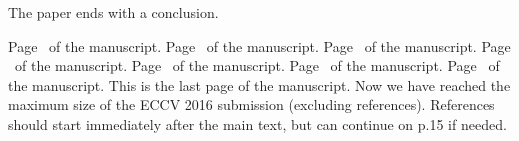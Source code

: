 \documentclass[runningheads]{llncs}
\begin{document}
The paper ends with a conclusion.


\clearpage\mbox{}Page \thepage\ of the manuscript.
\clearpage\mbox{}Page \thepage\ of the manuscript.
\clearpage\mbox{}Page \thepage\ of the manuscript.
\clearpage\mbox{}Page \thepage\ of the manuscript.
\clearpage\mbox{}Page \thepage\ of the manuscript.
\clearpage\mbox{}Page \thepage\ of the manuscript.
\clearpage\mbox{}Page \thepage\ of the manuscript.
This is the last page of the manuscript.
\vfill
Now we have reached the maximum size of the ECCV 2016 submission (excluding references).
References should start immediately after the main text, but can continue on p.15 if needed.

\clearpage



\end{document}
